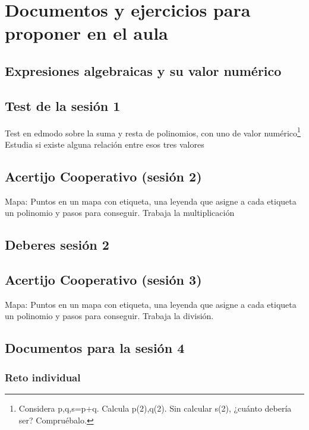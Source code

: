 \chapter{Documentos y ejercicios para proponer en el aula}


\section{Expresiones algebraicas y su valor numérico}
\label{app:DocModel}



\section{Test de la sesión 1}
\label{test:ses1}

Test en edmodo sobre la suma y resta de polinomios, con uno de valor numérico\footnote{Considera p,q,s=p+q. Calcula p(2),q(2). Sin calcular s(2), ¿cuánto debería ser? Compruébalo.}
%
Estudia si existe alguna relación entre esos tres valores 

\section{Acertijo Cooperativo (sesión 2)}
\label{app:ses2:coop}


Mapa: Puntos en un mapa con etiqueta, una leyenda que asigne a cada etiqueta un polinomio y pasos para conseguir.
%
Trabaja la multiplicación


\section{Deberes sesión 2}
\label{app:ses2:deberes}



\section{Acertijo Cooperativo (sesión 3)}
\label{app:ses3:coop}


Mapa: Puntos en un mapa con etiqueta, una leyenda que asigne a cada etiqueta un polinomio y pasos para conseguir.
%
Trabaja la división.

\section{Documentos para la sesión 4}

\subsection{Reto individual}
\label{app:ses4:indiv}

